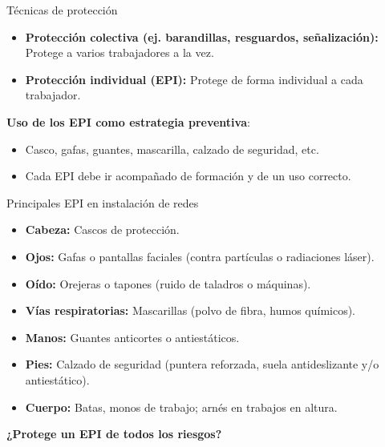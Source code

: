 \documentclass{beamer}
\begin{document}
\begin{frame}{Técnicas de protección}
    \begin{itemize}
        \item \textbf{Protección colectiva (ej. barandillas, resguardos, señalización):} Protege a varios trabajadores a la vez.
        \item \textbf{Protección individual (EPI):} Protege de forma individual a cada trabajador. 
    \end{itemize}
    \textbf{Uso de los EPI como estrategia preventiva}:
    \begin{itemize}
        \item Casco, gafas, guantes, mascarilla, calzado de seguridad, etc.
        \item Cada EPI debe ir acompañado de formación y de un uso correcto.
    \end{itemize}
\end{frame}

\begin{frame}{Principales EPI en instalación de redes}
    \begin{itemize}
        \item \textbf{Cabeza:} Cascos de protección.
        \item \textbf{Ojos:} Gafas o pantallas faciales (contra partículas o radiaciones láser).
        \item \textbf{Oído:} Orejeras o tapones (ruido de taladros o máquinas).
        \item \textbf{Vías respiratorias:} Mascarillas (polvo de fibra, humos químicos).
        \item \textbf{Manos:} Guantes anticortes o antiestáticos.
        \item \textbf{Pies:} Calzado de seguridad (puntera reforzada, suela antideslizante y/o antiestático).
        \item \textbf{Cuerpo:} Batas, monos de trabajo; arnés en trabajos en altura.
    \end{itemize}
    \textbf{¿Protege un EPI de todos los riesgos?}
\end{frame}
\end{document}
